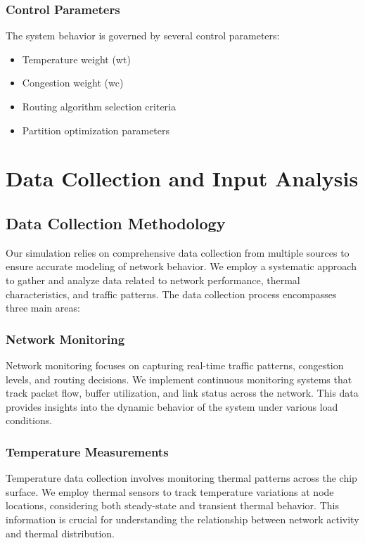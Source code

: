 \documentclass[12pt]{article}
\begin{document}
\subsubsection{Control Parameters}
The system behavior is governed by several control parameters:
\begin{itemize}[noitemsep]
    \item Temperature weight (wt)
    \item Congestion weight (wc)
    \item Routing algorithm selection criteria
    \item Partition optimization parameters
\end{itemize}

\section{Data Collection and Input Analysis}
\subsection{Data Collection Methodology}
Our simulation relies on comprehensive data collection from multiple sources to ensure accurate modeling of network behavior. We employ a systematic approach to gather and analyze data related to network performance, thermal characteristics, and traffic patterns. The data collection process encompasses three main areas:

\subsubsection{Network Monitoring}
Network monitoring focuses on capturing real-time traffic patterns, congestion levels, and routing decisions. We implement continuous monitoring systems that track packet flow, buffer utilization, and link status across the network. This data provides insights into the dynamic behavior of the system under various load conditions.

\subsubsection{Temperature Measurements}
Temperature data collection involves monitoring thermal patterns across the chip surface. We employ thermal sensors to track temperature variations at node locations, considering both steady-state and transient thermal behavior. This information is crucial for understanding the relationship between network activity and thermal distribution.
\end{document}
